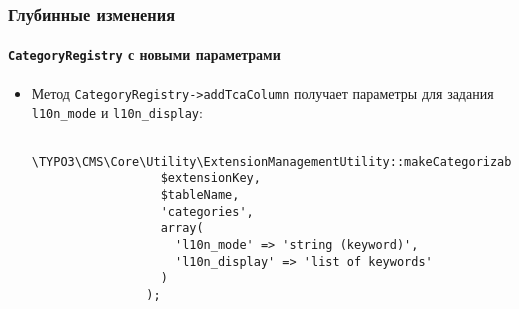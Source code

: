 \begin{frame}[fragile]
	\frametitle{Глубинные изменения}
	\framesubtitle{\texttt{CategoryRegistry} с новыми параметрами}

	\lstset{basicstyle=\tiny\ttfamily}

	\begin{itemize}

		\item Метод \texttt{CategoryRegistry->addTcaColumn} получает параметры для задания
			\texttt{l10n\_mode} и \texttt{l10n\_display}:

			\begin{lstlisting}
				\TYPO3\CMS\Core\Utility\ExtensionManagementUtility::makeCategorizable(
				  $extensionKey,
				  $tableName,
				  'categories',
				  array(
				    'l10n_mode' => 'string (keyword)',
				    'l10n_display' => 'list of keywords'
				  )
				);
			\end{lstlisting}

	\end{itemize}

\end{frame}


